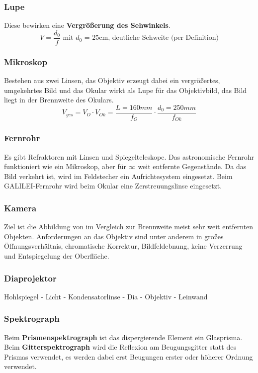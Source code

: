 \documentclass[12pt,a4paper,ngerman]{article}
\begin{document}
\subsubsection*{Lupe}
Diese bewirken eine \textbf{Vergrößerung des Sehwinkels}. 
\begin{equation}
V = \frac{d_0}{f} \text{ mit } d_0 \text{ = 25cm, deutliche Sehweite (per Definition)}
\end{equation}

\subsubsection*{Mikroskop}
Bestehen aus zwei Linsen, das Objektiv erzeugt dabei ein vergrößertes, umgekehrtes Bild und das Okular wirkt als Lupe für das Objektivbild, das Bild liegt in der Brennweite des Okulars.
\begin{equation}
V_{ges} = V_O \cdot V_{Ok} = \frac{L = 160mm}{f_O}\cdot \frac{d_0 = 250mm}{f_{Ok}} 
\end{equation}

\subsubsection*{Fernrohr}
Es gibt Refraktoren mit Linsen und Spiegelteleskope. Das astronomische Fernrohr funktioniert wie ein Mikroskop, aber für $\infty$ weit entfernte Gegenstände. Da das Bild verkehrt ist, wird im Feldstecher ein Aufrichtesystem eingesetzt. Beim GALILEI-Fernrohr wird beim Okular eine Zerstreuungslinse eingesetzt. 

\subsubsection*{Kamera}
Ziel ist die Abbildung von im Vergleich zur Brennweite meist sehr weit entfernten Objekten. Anforderungen an das Objektiv sind unter anderem in großes Öffnungsverhältnis, chromatische Korrektur, Bildfeldebnung, keine Verzerrung und Entspiegelung der Oberfläche. 

\subsubsection*{Diaprojektor}
Hohlspiegel - Licht - Kondensatorlinse - Dia - Objektiv - Leinwand

\subsubsection*{Spektrograph}
Beim \textbf{Prismenspektrograph} ist das dispergierende Element ein Glasprisma. Beim \textbf{Gitterspektrograph} wird die Reflexion am Beugungsgitter statt des Prismas verwendet, es werden dabei erst Beugungen erster oder höherer Ordnung verwendet. 
\end{document}
